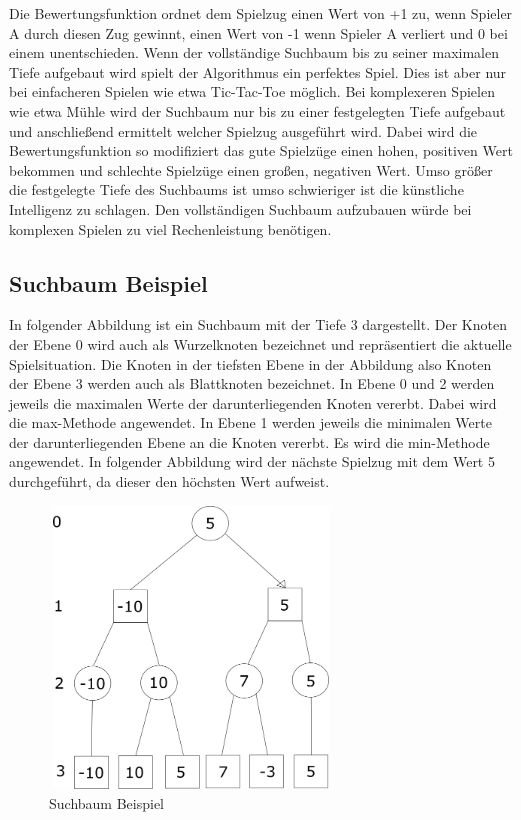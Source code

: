 \documentclass[oneside]{ausarbeitung}
\begin{document}
Die Bewertungsfunktion ordnet dem Spielzug einen Wert von +1 zu, wenn Spieler A durch diesen Zug gewinnt, einen Wert von -1 wenn Spieler A verliert und 0 bei einem unentschieden. Wenn der vollständige Suchbaum bis zu seiner maximalen Tiefe aufgebaut wird spielt der Algorithmus ein perfektes Spiel. Dies ist aber nur bei einfacheren Spielen wie etwa Tic-Tac-Toe möglich. Bei komplexeren Spielen wie etwa Mühle wird der Suchbaum nur bis zu einer festgelegten Tiefe aufgebaut und anschließend ermittelt welcher Spielzug ausgeführt wird. Dabei wird die Bewertungsfunktion so modifiziert das gute Spielzüge einen hohen, positiven Wert bekommen und schlechte Spielzüge einen großen, negativen Wert. Umso größer die festgelegte Tiefe des Suchbaums ist umso schwieriger ist die künstliche Intelligenz zu schlagen. Den vollständigen Suchbaum aufzubauen würde bei komplexen Spielen zu viel Rechenleistung benötigen.

\subsection{Suchbaum Beispiel}

In folgender Abbildung ist ein Suchbaum mit der Tiefe 3 dargestellt. Der Knoten der Ebene 0 wird auch als Wurzelknoten bezeichnet und repräsentiert die aktuelle Spielsituation. Die Knoten in der tiefsten Ebene in der Abbildung also Knoten der Ebene 3 werden auch als Blattknoten bezeichnet. In Ebene 0 und 2 werden jeweils die maximalen Werte der darunterliegenden Knoten vererbt. Dabei wird die max-Methode angewendet. In Ebene 1 werden jeweils die minimalen Werte der darunterliegenden Ebene an die Knoten vererbt. Es wird die min-Methode angewendet. In folgender Abbildung wird der nächste Spielzug mit dem Wert 5 durchgeführt, da dieser den höchsten Wert aufweist.

\begin{figure}[ht]
	\centering
	\includegraphics[width=7.5cm,height=7.5cm]{images/suchbaum.png}
	\caption[Suchbaum Beispiel]{Suchbaum Beispiel}
\end{figure}
\end{document}
